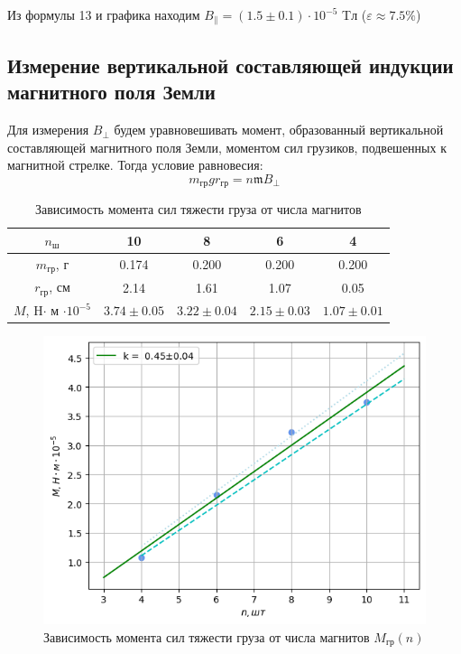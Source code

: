 \begin{center}
    Из формулы 13 и графика находим $B_{\parallel} = (1.5 \pm 0.1)\cdot 10^{-5}$ Tл ($\varepsilon \approx 7.5\%$)
\end{center}
\newpage
\subsection*{Измерение вертикальной составляющей индукции магнитного поля Земли}
Для измерения $B_{\perp}$ будем уравновешивать момент, образованный вертикальной составляющей магнитного поля Земли, моментом сил грузиков, подвешенных к магнитной стрелке. Тогда условие равновесия:
\begin{equation}
    m_{\text{гр}}gr_{\text{гр}} = n\mathfrak{m}B_{\perp}
\end{equation}

\begin{table}[!h]
    \centering
    \begin{tabular}{|c|c|c|c|c|}
        \hline
        $n_{\text{ш}}$ & 10 & 8 & 6 & 4\\\hline
        $m_{\text{гр}}$, г&0.174 & 0.200 & 0.200 & 0.200\\\hline
        $r_{\text{гр}}$, см& 2.14 & 1.61 & 1.07 & 0.05\\\hline
        $M$, H$\cdot$ м $\cdot 10^{-5}$& $3.74 \pm 0.05$ & $3.22 \pm 0.04$ & $2.15 \pm 0.03$ & $1.07 \pm 0.01$\\\hline 
    \end{tabular}
    \caption{Зависимость момента сил тяжести груза от числа магнитов}
\end{table}

\begin{figure}[!h]
    \centering
    \includegraphics[width=12cm]{plot2.png}
\caption{Зависимость момента сил тяжести груза от числа магнитов $M_{\text{гр}}(n)$}
\end{figure}

